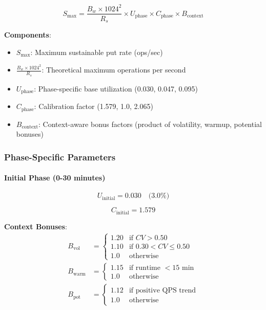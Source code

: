 \begin{equation}
S_{\max} = \frac{B_w \times 1024^2}{R_s} \times U_{\text{phase}} \times C_{\text{phase}} \times B_{\text{context}}
\label{eq:v53_core}
\end{equation}

\textbf{Components}:

\begin{itemize}
    \item $S_{\max}$: Maximum sustainable put rate (ops/sec)
    \item $\frac{B_w \times 1024^2}{R_s}$: Theoretical maximum operations per second
    \item $U_{\text{phase}}$: Phase-specific base utilization (0.030, 0.047, 0.095)
    \item $C_{\text{phase}}$: Calibration factor (1.579, 1.0, 2.065)
    \item $B_{\text{context}}$: Context-aware bonus factors (product of volatility, warmup, potential bonuses)
\end{itemize}

\subsubsection{Phase-Specific Parameters}

\paragraph{Initial Phase (0-30 minutes)}

\begin{equation}
U_{\text{initial}} = 0.030 \quad \text{(3.0\%)}
\end{equation}

\begin{equation}
C_{\text{initial}} = 1.579
\end{equation}

\textbf{Context Bonuses}:
\begin{align}
B_{\text{vol}} &= \begin{cases}
1.20 & \text{if } CV > 0.50 \\
1.10 & \text{if } 0.30 < CV \leq 0.50 \\
1.0  & \text{otherwise}
\end{cases} \\
B_{\text{warm}} &= \begin{cases}
1.15 & \text{if runtime } < 15 \text{ min} \\
1.0  & \text{otherwise}
\end{cases} \\
B_{\text{pot}} &= \begin{cases}
1.12 & \text{if positive QPS trend} \\
1.0  & \text{otherwise}
\end{cases}
\end{align}

